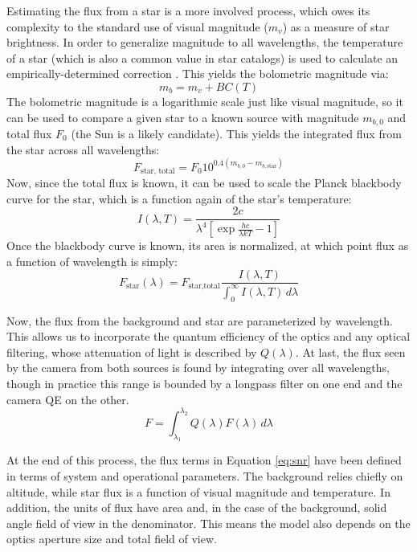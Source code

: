 \documentclass[twocolumn,letterpaper]{IEEEAerospace2012}
\newcommand{\parens} [1] {\left(  #1  \right)}
\newcommand{\brackets} [1] {\left[ #1 \right]}
\newcommand{\BC}{\mathit{BC}}
\newcommand{\sub}[1]{\text{#1}} %
\begin{document}
Estimating the flux from a star is a more involved process, which owes its complexity to the standard use of visual magnitude ($m_v$) as a measure of star brightness. In order to generalize magnitude to all wavelengths, the temperature of a star (which is also a common value in star catalogs) is used to calculate an empirically-determined correction \cite{bolometric}. This yields the bolometric magnitude via:
\begin{equation}
    \label{eq:bolometric}
    m_b = m_v + \BC (T)
\end{equation}
The bolometric magnitude is a logarithmic scale just like visual magnitude, so it can be used to compare a given star to a known source with magnitude $m_{b,0}$ and total flux $F_0$ (the Sun is a likely candidate). This yields the integrated flux from the star across all wavelengths:
\begin{equation}
    \label{eq:totalflux}
    F_{\sub{star, total}} = F_0 10^{0.4 \parens{m_{b,0} - m_{b,\sub{star}}}}
\end{equation}
Now, since the total flux is known, it can be used to scale the Planck blackbody curve for the star, which is a function again of the star's temperature:
\begin{equation}
    \label{eq:planck}
    I(\lambda, T) = \frac{2c}{\lambda^4 \brackets{\exp{\frac{hc}{\lambda k T}} - 1}}
\end{equation}
Once the blackbody curve is known, its area is normalized, at which point flux as a function of wavelength is simply:
\begin{equation}
    \label{eq:flux}
    F_{\sub{star}}(\lambda) = F_{\sub{star,total}}\frac{I(\lambda,T)}{\int_0^\infty I(\lambda,T) \, d\lambda}
\end{equation}

Now, the flux from the background and star are parameterized by wavelength. This allows us to incorporate the quantum efficiency of the optics and any optical filtering, whose attenuation of light is described by $Q(\lambda)$. At last, the flux seen by the camera from both sources is found by integrating over all wavelengths, though in practice this range is bounded by a longpass filter on one end and the camera QE on the other.
\begin{equation}
    \label{eq:totalfluxes}
    F = \int_{\lambda_1}^{\lambda_2} Q(\lambda) F(\lambda) \, d\lambda
\end{equation}

At the end of this process, the flux terms in Equation \ref{eq:snr} have been defined in terms of system and operational parameters. The background relies chiefly on altitude, while star flux is a function of visual magnitude and temperature. In addition, the units of flux have area and, in the case of the background, solid angle field of view in the denominator. This means the model also depends on the optics aperture size and total field of view.
\end{document}
